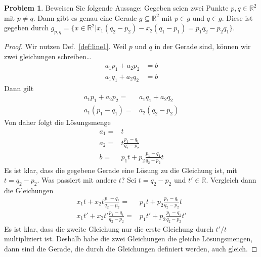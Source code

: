 \documentclass[prb,12pt]{revtex4-2}
\theoremstyle{definition}
\newtheorem{Problem}{Problem}
\theoremstyle{definition}
\newcommand{\R}{\mathbb{R}}
\begin{document}
\begin{Problem}\label{pr:linalg1-3}
	Beweisen Sie folgende Aussage:
Gegeben seien zwei Punkte $p, q \in \R^2$ mit $p \neq  q$. Dann gibt es genau eine Gerade $g \subseteq \R^2$ mit $p \in g$ und $q \in g$. Diese ist gegeben durch $g_{p,q} = \{x \in \R^2 |x_1 (q_2 - p_2 ) - x_2(q_1 - p_1 ) = p_1q_2-  p_2q_1\}$.
\end{Problem}

\begin{proof}
	Wir nutzen Def.~\ref{def:line1}. Weil $p$ und $q$ in der Gerade sind, können wir zwei gleichungen schreiben\ldots
	\begin{align*}
		a_1p_1+a_2p_2&=b\\
		a_1q_1+a_2q_2&=b
	\end{align*}
	Dann gilt
	\begin{align*}
		a_1p_1+a_2p_2=& a_1q_1+a_2q_2\\
		a_1(p_1-q_1)=& a_2(q_2-p_2)
	\end{align*}
	Von daher folgt die L\"{o}sungsmenge
	\begin{align*}
		a_1=&t\\
		a_2=&t\frac{p_1-q_1}{q_2-p_2}\\
		b=&p_1t+p_2\frac{p_1-q_1}{q_2-p_2}t
	\end{align*}
	Es ist klar, dass die gegebene Gerade eine Lösung zu die Gleichung ist, mit $t=q_2-p_2$. Was passiert mit andere $t$? Sei $t=q_2-p_2$ und $t'\in \R$. Vergleich dann die Gleichungen
	\begin{align*}
		x_1t+x_2t\frac{p_1-q_1}{q_2-p_2}=&p_1t+p_2\frac{p_1-q_1}{q_2-p_2}t\\
		x_1t'+x_2t'\frac{p_1-q_1}{q_2-p_2}=&p_1t'+p_2\frac{p_1-q_1}{q_2-p_2}t'
	\end{align*}
	Es ist klar, dass die zweite Gleichung nur die erste Gleichung durch $t' / t$ multipliziert ist. Deshalb habe die zwei Gleichungen die gleiche Lösungsmengen, dann sind die Gerade, die durch die Gleichungen definiert werden, auch gleich.
\end{proof}
\end{document}
